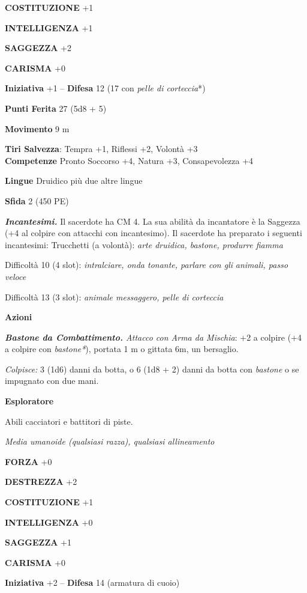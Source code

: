 \begin{multicols}{2}
\textbf{COSTITUZIONE} +1

\textbf{INTELLIGENZA} +1

\textbf{SAGGEZZA} +2

\textbf{CARISMA} +0

\textbf{Iniziativa} +1 -- \textbf{Difesa} 12 (17 con \emph{pelle di corteccia}*)

\textbf{Punti Ferita} 27 (5d8 + 5)

\textbf{Movimento} 9 m

\textbf{Tiri Salvezza}: Tempra +1, Riflessi +2, Volontà +3 \\

\textbf{Competenze} Pronto Soccorso +4, Natura +3, Consapevolezza +4 

\textbf{Lingue} Druidico più due altre lingue

\textbf{Sfida} 2 (450 PE)

\emph{\textbf{Incantesimi.}} Il sacerdote ha CM 4. La sua abilità da incantatore è la Saggezza (+4 al colpire con attacchi con incantesimo). Il sacerdote ha preparato i seguenti incantesimi: Trucchetti (a volontà): \emph{arte druidica, bastone, produrre fiamma}

Difficoltà 10 (4 slot): \emph{intralciare, onda tonante, parlare con gli}
\emph{animali, passo veloce}

Difficoltà 13 (3 slot): \emph{animale messaggero, pelle di corteccia}

\textbf{Azioni}

\emph{\textbf{Bastone da Combattimento.} Attacco con Arma da Mischia}: +2 a colpire (+4 a colpire con \emph{bastone*}), portata 1 m o gittata 6m, un bersaglio.

\emph{Colpisce:} 3 (1d6) danni da botta, o 6 (1d8 + 2) danni da botta con \emph{bastone} o se impugnato con due mani.

\medskip\textbf{Esploratore}

Abili cacciatori e battitori di piste.

\emph{Media umanoide (qualsiasi razza), qualsiasi allineamento}

\textbf{FORZA} +0

\textbf{DESTREZZA} +2

\textbf{COSTITUZIONE} +1

\textbf{INTELLIGENZA} +0

\textbf{SAGGEZZA} +1

\textbf{CARISMA} +0

\textbf{Iniziativa} +2 -- \textbf{Difesa} 14 (armatura di cuoio)


\end{multicols}
